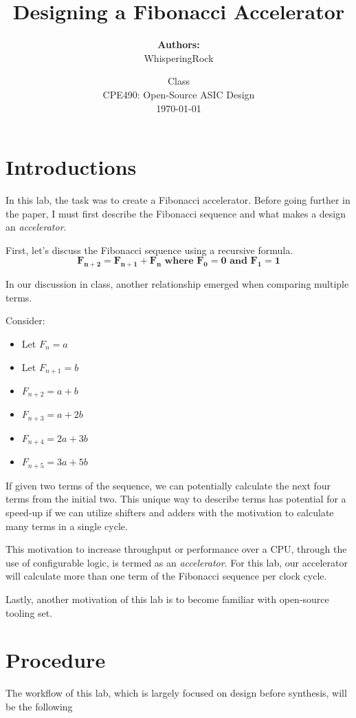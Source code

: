\documentclass[a4paper]{report}
\title{\Huge{Designing a Fibonacci Accelerator}}
\author{\textbf{Authors:} \\WhisperingRock}
\date{Class\\CPE490: Open-Source ASIC Design\\\today}
\begin{document}
    \maketitle
	

	\tableofcontents

	\chapter{Introductions}
		In this lab, the task was to create a Fibonacci accelerator. Before
		going further in the paper, I must first describe the Fibonacci 
		sequence and what makes a design an \textit{accelerator}. 

		First, let's discuss the Fibonacci sequence using a recursive formula. 
		\[
			\bm{F_{n+2} = F_{n+1} + F_{n} \text{ where } F_0 = 0 \text{ and } F_1 = 1}
		\]

		In our discussion in class, another relationship emerged when comparing multiple terms.

		Consider:
		\begin{itemize}
			\item Let $F_{n} = a$ 
			\item Let $F_{n+1} = b$ 
			\item $F_{n+2} = a + b$
			\item $F_{n+3} = a + 2b$
			\item $F_{n+4} = 2a + 3b$
			\item $F_{n+5} = 3a + 5b$
		\end{itemize}

		If given two terms of the sequence, we can potentially calculate
		the next four terms from the initial two. This unique way to describe terms 
		has potential for a speed-up if we can utilize shifters and adders
		with the motivation to calculate many terms in a single cycle. 

		This motivation to increase throughput or performance over a CPU, 
		through the use of configurable logic, is termed as an \textit{accelerator}. 
		For this lab, our accelerator will calculate more than one term
		of the Fibonacci sequence per clock cycle. 

		Lastly, another motivation of this lab is to become familiar with 
		open-source tooling set. 

	\chapter{Procedure}
		The workflow of this lab, which is largely focused on design before
		synthesis, will be the following
\end{document}
